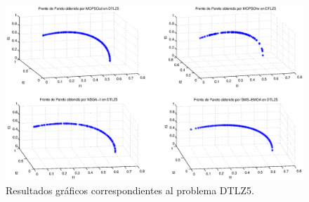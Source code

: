 \clearpage
\newpage
 \begin{figure}
      \begin{center}
	  \includegraphics[scale=0.45]{Cap4/rdtlz5r.eps}
      \end{center}
	\caption{Resultados gr\'aficos correspondientes al problema DTLZ5.}
      \label{fig:rDTLZ5}
 \end{figure}
\clearpage
 \newpage
